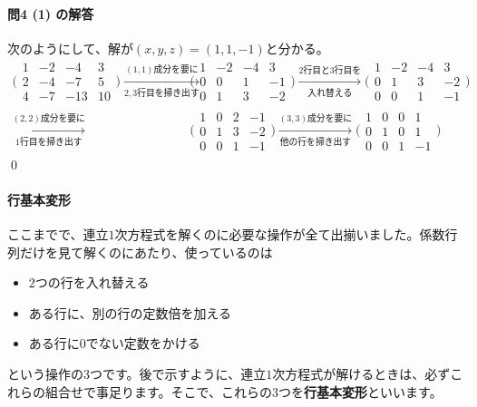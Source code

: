 \paragraph{問4 (1) の解答}

次のようにして、解が$(x, y, z) = (1, 1, -1)$と分かる。
\begin{align*}
\Biggl(
\begin{array}{rrr|r}
1 & -2 & -4 & 3 \\
2 & -4 & -7 & 5 \\
4 & -7 & -13 & 10
\end{array}
\Biggr) \xrightarrow[\text{$2,3$行目を掃き出す}]{\text{$(1,1)$成分を要に}}
& \Biggl(
\begin{array}{rrr|r}
1 & -2 & -4 & 3 \\
0 & 0 & 1 & -1 \\
0 & 1 & 3 & -2
\end{array}
\Biggr) \xrightarrow[入れ替える]{\text{$2$行目と$3$行目を}}
\Biggl(
\begin{array}{rrr|r}
1 & -2 & -4 & 3 \\
0 & 1 & 3 & -2 \\
0 & 0 & 1 & -1
\end{array}
\Biggr) \\ \xrightarrow[\text{$1$行目を掃き出す}]{\text{$(2,2)成分を要に$}}
& \Biggl(
\begin{array}{rrr|r}
1 & 0 & 2 & -1 \\
0 & 1 & 3 & -2 \\
0 & 0 & 1 & -1
\end{array}
\Biggr) \xrightarrow[\text{他の行を掃き出す}]{\text{$(3,3)$成分を要に}}
\Biggl(
\begin{array}{rrr|r}
1 & 0 & 0 & 1 \\
0 & 1 & 0 & 1 \\
0 & 0 & 1 & -1
\end{array}
\Biggr)
\end{align*}
\qed

\paragraph{行基本変形}
ここまでで、連立$1$次方程式を解くのに必要な操作が全て出揃いました。係数行列だけを見て解くのにあたり、使っているのは
\begin{itemize}
\item $2$つの行を入れ替える
\item ある行に、別の行の定数倍を加える
\item ある行に$0$でない定数をかける
\end{itemize}
という操作の$3$つです。後で示すように、連立$1$次方程式が解けるときは、必ずこれらの組合せで事足ります。そこで、これらの$3$つを\textbf{行基本変形}といいます。

